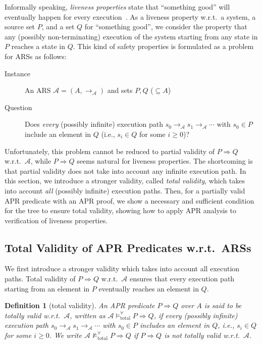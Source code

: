 \documentclass[10pt,a4paper]{article}
\newtheorem{definition}[theorem]{Definition}
\def\cA{\mathcal{A}}
\newcommand{\ReachPred}[2]{#1 \Rightarrow #2}
\newcommand{\Valid}[3]{#2 \mathrel{\mathrel{\models^\forall_{\mathrm{#1}}}} #3}
\newcommand{\NotValid}[3]{#2 \mathrel{\mathrel{\not\models^\forall_{\mathrm{#1}}}} #3}
\newcommand{\TotallyValid}[2][\cA]{\Valid{total}{#1}{#2}}
\newcommand{\NotTotallyValid}[2][\cA]{\NotValid{total}{#1}{#2}}
\begin{document}
Informally speaking, \emph{liveness properties} state that ``something good'' will eventually happen for every execution~\cite[Section~3.4]{BK08}.
As a liveness property w.r.t.\ a system, a source set $P$, and a set $Q$ for ``something good'', we consider the property that
any (possibly non-terminating) execution of the system starting from any state in $P$ reaches a state in $Q$.
This kind of safety properties is formulated as a problem for ARSs as follows:
\begin{description}
	\item[Instance] An ARS $\cA=(A,\to_\cA)$ and sets $P,Q$ ($\subseteq A$)
	\item[Question] Does \emph{every} (possibly infinite) execution path $s_0 \to_\cA s_1 \to_\cA \cdots$ with $s_0 \in P$ include an element in $Q$ (i.e., $s_i \in Q$ for some $i \geq 0$)?
\end{description}
Unfortunately, this problem cannot be reduced to partial validity of $\ReachPred{P}{Q}$ w.r.t.\ $\cA$, while $\ReachPred{P}{Q}$ seems natural for liveness properties.
The shortcoming is that partial validity does not take into account any infinite execution path.
In this section, we introduce a stronger validity, called \emph{total validity}, which takes into account \emph{all} (possibly infinite) execution paths.
Then, for a partially valid APR predicate with an APR proof, we show a necessary and sufficient condition for the tree to ensure total validity, showing how to apply APR analysis to verification of liveness properties.

\subsection{Total Validity of APR Predicates w.r.t.\ ARSs}
\label{subsec:total-validity}

We first introduce a stronger validity which takes into account all execution paths.
Total validity of $\ReachPred{P}{Q}$ w.r.t.\ $\cA$ ensures that every execution path starting from an element in $P$ eventually reaches an element in $Q$.
\begin{definition}[total validity]
	An APR predicate $\ReachPred{P}{Q}$ over $A$ is said to be \emph{totally valid} w.r.t.\ $\cA$, written as $\TotallyValid{\ReachPred{P}{Q}}$, if
	every (possibly infinite) execution path $s_0 \to_\cA s_1 \to_\cA \cdots$ with $s_0 \in P$ includes an element in $Q$, i.e., $s_i \in Q$ for some $i \geq 0$.
	We write $\NotTotallyValid[\cA]{\ReachPred{P}{Q}}$ if $\ReachPred{P}{Q}$ is not totally valid w.r.t.\ $\cA$.
\end{definition}
\end{document}
